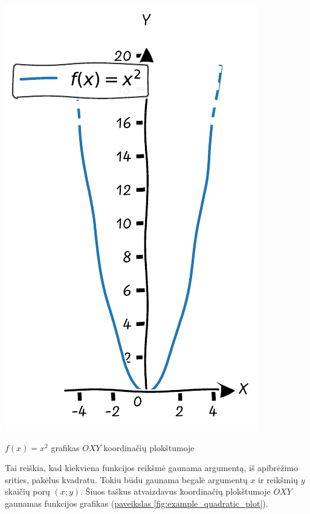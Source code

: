 \documentclass{tufte-handout}
\begin{document}
\begin{marginfigure}%

  \includegraphics[width=\linewidth]{./graphs/quadratic_function_plot_example.pdf}
  \caption{$f(x)=x^2$ grafikas $OXY$ koordinačių plokštumoje}
  \label{fig:example_quadratic_plot}
\end{marginfigure}

Tai reiškia, kad kiekviena funkcijos reikšmė gaunama argumentą, iš apibrėžimo
srities, pakėlus kvadratu. Tokiu būdu gaunama begalė argumentų $x$ ir reikšmių
$y$ skaičių porų
$(x; y)$. Šiuos taškus atvaizdavus koordinačių plokštumoje $OXY$ gaunamas
funkcijos grafikas (\hyperref[fig:example_quadratic_plot]{paveikslas
  \ref*{fig:example_quadratic_plot}}).
\end{document}
